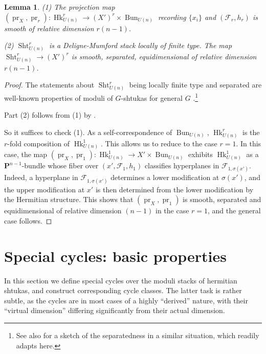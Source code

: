 \documentclass[reqno]{amsart}
\numberwithin{equation}{section}
\newcommand{\PP}{\mathbf{P}}
\DeclareMathOperator{\GL}{GL}
\DeclareMathOperator{\Bun}{Bun}
\DeclareMathOperator{\Sht}{Sht}
\DeclareMathOperator{\pr}{pr}
\DeclareMathOperator{\Hk}{Hk}
\newcommand{\s}{\sigma}
\newcommand\cF{\mathcal{F}}
\newtheorem{lemma}[thm]{Lemma}
\theoremstyle{remark}
\numberwithin{equation}{section}
\begin{document}
\begin{lemma}\label{lem: shtuka geometry} 
(1) The projection map $(\pr_{X}, \pr_{r}):\Hk_{U(n)}^r \rightarrow (X')^r \times \Bun_{U(n)}$ recording $\{x_{i}\}$ and $(\cF_{r},h_{r})$ is smooth of relative dimension $r(n-1)$. 

(2) $\Sht_{U(n)}^r$ is a Deligne-Mumford stack locally of finite type. The map $\Sht_{U(n)}^r \rightarrow (X')^r$ is smooth, separated, equidimensional of relative dimension $r(n-1)$. 
\end{lemma}

\begin{proof}
The statements about $\Sht_{U(n)}^r$ being locally finite type and separated are well-known properties of moduli of $G$-shtukas for general $G$ \cite[Proposition 2.16 and Theorem 2.20]{V04}.\footnote{See also \cite[paragraph after Theorem 5.4]{YZ} for a sketch of the separatedness in a similar situation, which readily adapts here.}

Part (2) follows from (1) by \cite[Lemma 2.13]{Laff18}. 

So it suffices to check (1).  As a self-correspondence of $\Bun_{U(n)}$, $\Hk^{r}_{U(n)}$ is the $r$-fold composition of $\Hk^{1}_{U(n)}$. This allows us to reduce to the case $r=1$.  In this case, the map $(\pr_{X},\pr_{1}): \Hk^{1}_{U(n)}\to X'\times\Bun_{U(n)}$ exhibits $\Hk^{1}_{U(n)}$ as a $\PP^{n-1}$-bundle whose fiber over $(x', \cF_{1},h_{1})$ classifies hyperplanes in $\cF_{1,\s(x')}$. Indeed, a hyperplane in $\cF_{1, \s(x')}$ determines a lower modification at $\s(x')$, and the upper modification at $x'$ is then determined from the lower modification by the Hermitian structure. This shows that $(\pr_{X},\pr_{1})$ is smooth, separated and equidimensional of relative dimension $(n-1)$ in the case $r=1$, and the general case follows.


\end{proof}





\section{Special cycles: basic properties}\label{s:int prob}

In this section we define special cycles over the moduli stacks of hermitian shtukas, and construct corresponding cycle classes. The latter task is rather subtle, as the cycles are in most cases of a highly ``derived'' nature, with their ``virtual dimension'' differing significantly from their actual dimension. 
\end{document}

